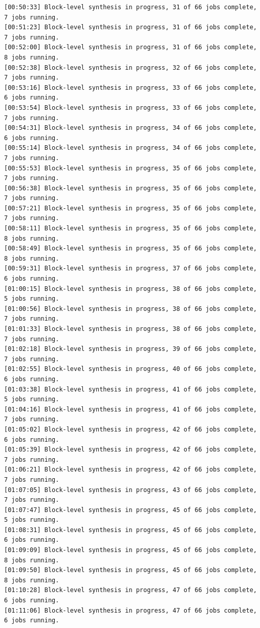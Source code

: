 \begin{lstlisting}
[00:50:33] Block-level synthesis in progress, 31 of 66 jobs complete, 7 jobs running.
[00:51:23] Block-level synthesis in progress, 31 of 66 jobs complete, 7 jobs running.
[00:52:00] Block-level synthesis in progress, 31 of 66 jobs complete, 8 jobs running.
[00:52:38] Block-level synthesis in progress, 32 of 66 jobs complete, 7 jobs running.
[00:53:16] Block-level synthesis in progress, 33 of 66 jobs complete, 6 jobs running.
[00:53:54] Block-level synthesis in progress, 33 of 66 jobs complete, 7 jobs running.
[00:54:31] Block-level synthesis in progress, 34 of 66 jobs complete, 6 jobs running.
[00:55:14] Block-level synthesis in progress, 34 of 66 jobs complete, 7 jobs running.
[00:55:53] Block-level synthesis in progress, 35 of 66 jobs complete, 7 jobs running.
[00:56:38] Block-level synthesis in progress, 35 of 66 jobs complete, 7 jobs running.
[00:57:21] Block-level synthesis in progress, 35 of 66 jobs complete, 7 jobs running.
[00:58:11] Block-level synthesis in progress, 35 of 66 jobs complete, 8 jobs running.
[00:58:49] Block-level synthesis in progress, 35 of 66 jobs complete, 8 jobs running.
[00:59:31] Block-level synthesis in progress, 37 of 66 jobs complete, 6 jobs running.
[01:00:15] Block-level synthesis in progress, 38 of 66 jobs complete, 5 jobs running.
[01:00:56] Block-level synthesis in progress, 38 of 66 jobs complete, 7 jobs running.
[01:01:33] Block-level synthesis in progress, 38 of 66 jobs complete, 7 jobs running.
[01:02:18] Block-level synthesis in progress, 39 of 66 jobs complete, 7 jobs running.
[01:02:55] Block-level synthesis in progress, 40 of 66 jobs complete, 6 jobs running.
[01:03:38] Block-level synthesis in progress, 41 of 66 jobs complete, 5 jobs running.
[01:04:16] Block-level synthesis in progress, 41 of 66 jobs complete, 7 jobs running.
[01:05:02] Block-level synthesis in progress, 42 of 66 jobs complete, 6 jobs running.
[01:05:39] Block-level synthesis in progress, 42 of 66 jobs complete, 7 jobs running.
[01:06:21] Block-level synthesis in progress, 42 of 66 jobs complete, 7 jobs running.
[01:07:05] Block-level synthesis in progress, 43 of 66 jobs complete, 7 jobs running.
[01:07:47] Block-level synthesis in progress, 45 of 66 jobs complete, 5 jobs running.
[01:08:31] Block-level synthesis in progress, 45 of 66 jobs complete, 6 jobs running.
[01:09:09] Block-level synthesis in progress, 45 of 66 jobs complete, 8 jobs running.
[01:09:50] Block-level synthesis in progress, 45 of 66 jobs complete, 8 jobs running.
[01:10:28] Block-level synthesis in progress, 47 of 66 jobs complete, 6 jobs running.
[01:11:06] Block-level synthesis in progress, 47 of 66 jobs complete, 6 jobs running.

\end{lstlisting}
